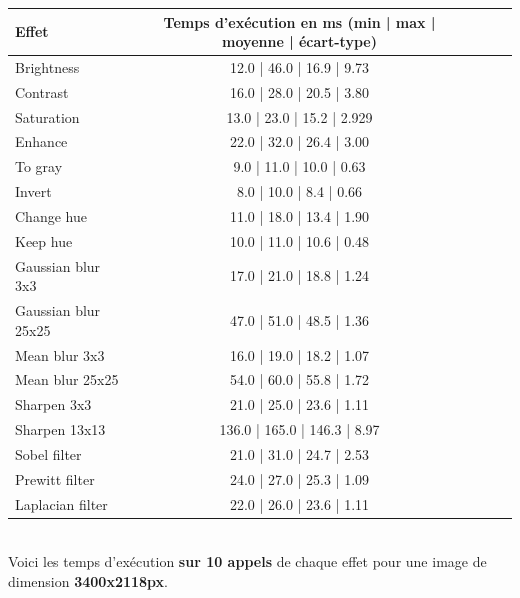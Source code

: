 \begin{tabular}{||l||c|c||c|c||}
    \hline
    \hline
    \textbf{Effet} & \textbf{Temps d'exécution en ms} (min | max | moyenne | écart-type)\\
    \hline
    \hline
    Brightness & 12.0 | 46.0 | 16.9 | 9.73\\
    \hline
    Contrast & 16.0 | 28.0 | 20.5 | 3.80\\
    \hline
    Saturation & 13.0 | 23.0 | 15.2 | 2.929\\
    \hline
    Enhance & 22.0 | 32.0 | 26.4 | 3.00\\
    \hline
    To gray & 9.0 | 11.0 | 10.0 | 0.63\\
    \hline
    Invert & 8.0 | 10.0 | 8.4 | 0.66\\
    \hline
    Change hue & 11.0 | 18.0 | 13.4 | 1.90\\
    \hline
    Keep hue & 10.0 | 11.0 | 10.6 | 0.48\\
    \hline
    Gaussian blur 3x3 & 17.0 | 21.0 | 18.8 | 1.24\\
    \hline
    Gaussian blur 25x25 & 47.0 | 51.0 | 48.5 | 1.36\\
    \hline
    Mean blur 3x3 & 16.0 | 19.0 | 18.2 | 1.07\\
    \hline
    Mean blur 25x25 & 54.0 | 60.0 | 55.8 | 1.72\\
    \hline
    Sharpen 3x3 & 21.0 | 25.0 | 23.6 | 1.11\\
    \hline
    Sharpen 13x13 & 136.0 | 165.0 | 146.3 | 8.97\\
    \hline
    Sobel filter & 21.0 | 31.0 | 24.7 | 2.53\\
    \hline
    Prewitt filter & 24.0 | 27.0 | 25.3 | 1.09\\
    \hline
    Laplacian filter & 22.0 | 26.0 | 23.6 | 1.11\\
    \hline
    \hline
  \end{tabular}
\\
\newpage
Voici les temps d'exécution \textbf{sur 10 appels} de chaque effet pour une image de dimension \textbf{3400x2118px}.
\\

